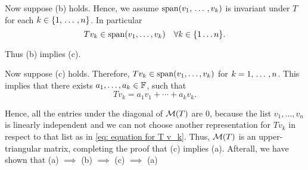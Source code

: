 \begin{prf}
  \StepTwo Now suppose (b) holds. Hence, we assume $\operatorname{span} (v_1, {\, \ldots \,\,}, v_k)$ is invariant under $T$ for each $k \in \{1, {\, \ldots \,\,}, n\}$. In particular
  \begin{equation}
    T v_k \in \operatorname{span} (v_1, \ldots, v_k) \quad \forall k \in \{1 \ldots n\}.
  \end{equation}

  Thus (b) implies (c).

  \StepThree Now suppose (c) holds. Therefore, $T v_k \in \operatorname{span} (v_1, \ldots, v_k)$ for $k = 1, {\, \ldots \,\,}, n$. This implies that there exists $a_1, \dots, a_k \in \mathbb{F}$, such that
  \begin{equation}
    \label{eq: equation for T v_k}
    T v_k = a_1 v_1 + \cdots + a_k v_k.
  \end{equation}

  Hence, all the entries under the diagonal of $\mathcal{M} (T)$ are $0$, because the list $v_1, \ldots, v_n$ is linearly independent and we can not choose another representation for $T v_k$ in respect to that list as in \eqref{eq: equation for T v_k}. Thus, $\mathcal{M}(T)$ is an upper-triangular matrix, completing the proof that (c) implies (a).
  Afterall, we have shown that (a) $\implies$ (b) $\implies$ (c) $\implies$ (a)
\end{prf}

